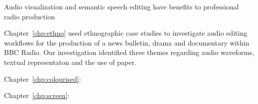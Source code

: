 Audio visualization and semantic speech editing have benefits to professional radio production





Chapter~\ref{chp:ethno} used ethnographic case studies to investigate audio editing workflows for the production of a
news bulletin, drama and documentary within BBC Radio. Our investigation identified three themes regarding audio
waveforms, textual representaton and the use of paper.

Chapter~\ref{chp:colourised}:




Chapter~\ref{chp:screen}:



